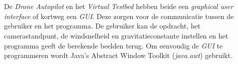 \\
\\
De \textit{Drone Autopilot} en het \textit{Virtual Testbed} hebben beide een \textit{graphical user interface} of kortweg een \textit{GUI}. Deze zorgen voor de communicatie tussen de gebruiker en het programma. De gebruiker kan de opdracht, het camerastandpunt, de windsnelheid en gravitatieconstante instellen en het programma geeft de berekende beelden terug. Om eenvoudig de \textit{GUI} te programmeren wordt Java's Abstract Window Toolkit (\textit{java.awt}) gebruikt. 

